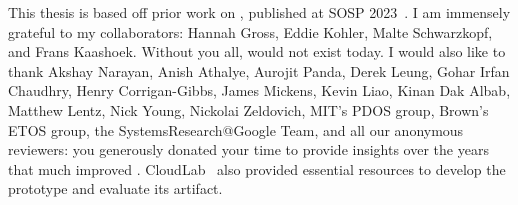 
%
This thesis is based off prior work on \sys, published at SOSP 2023~\cite{edna}.
I am immensely grateful to my collaborators: Hannah Gross, Eddie Kohler, Malte
Schwarzkopf, and Frans Kaashoek. Without you all, \sys would not exist today.
%
I would also like to thank Akshay Narayan, Anish Athalye, Aurojit Panda, Derek
Leung, Gohar Irfan Chaudhry, Henry Corrigan-Gibbs, James Mickens, Kevin Liao,
Kinan Dak Albab, Matthew Lentz, Nick Young, Nickolai Zeldovich, MIT's PDOS
group, Brown's ETOS group, the SystemsResearch@Google Team, and all our
anonymous reviewers: you generously
donated your time to provide insights over the years that much improved \sys. 
%
CloudLab~\cite{cloudlab} also provided essential resources to develop the \sys prototype
and evaluate its artifact.
%
%
%
%

\begin{comment}
**Family**
Stephanie ("Stephie")
Parents (Phaih-lan Law, Kenwood Tsai)
Ah-ma and Ah-gong Tsai
Cecilia and Jacek Smolinski
Jackie and Kenny Smolinski
Ah-Ee (and my goddogs, Toby and Sparky)
Wei-Jen
Wei-Ken
Ah-ma and Ah-gong Lau

**Family++**
Benji Kilimnik
Trevor Hohn

**Researchers**
Akshay Narayan, Anish Athalye, Derek Leung, Gohar Irfan Chaudhry, Henry
Corrigan-Gibbs, James Mickens, Kevin Liao, Kinan Dak Albab, Matthew Lentz,
Nickolai Zeldovich, and the anonymous reviewers 

Hannah Gross
Nick Young 

MIT's PDOS group, Brown's ETOS group, and
the SystemsResearch@Google Team 

Health team
\end{comment}
